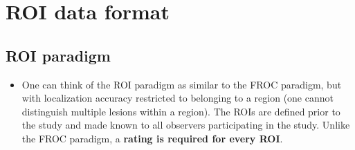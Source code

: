 \documentclass[]{book}
\providecommand{\tightlist}{%
  \setlength{\itemsep}{0pt}\setlength{\parskip}{0pt}}
\begin{document}
\hypertarget{roidataformat}{%
\chapter{ROI data format}\label{roidataformat}}

\hypertarget{roi-paradigm}{%
\section{ROI paradigm}\label{roi-paradigm}}

\begin{itemize}
\tightlist
\item
  One can think of the ROI paradigm as similar to the FROC paradigm, but with localization accuracy restricted to belonging to a region (one cannot distinguish multiple lesions within a region). The ROIs are defined prior to the study and made known to all observers participating in the study. Unlike the FROC paradigm, a \textbf{rating is required for every ROI}.
\end{itemize}


\end{document}
